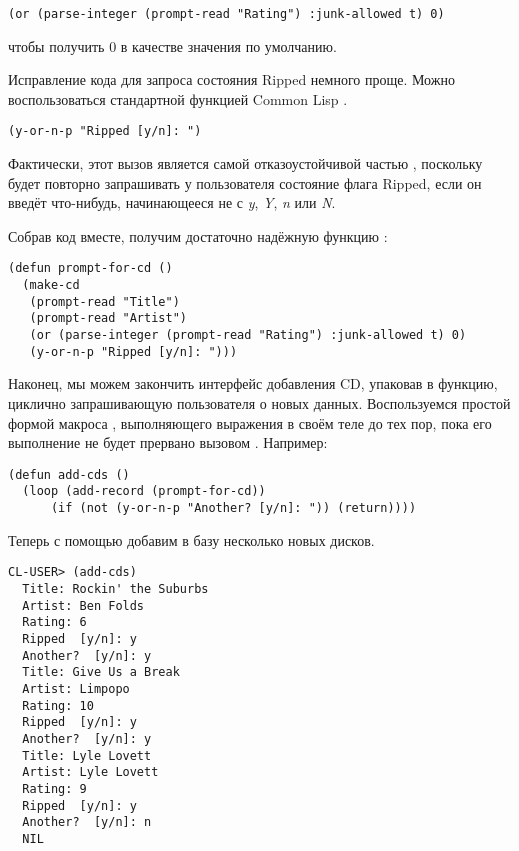 \begin{lstlisting}
(or (parse-integer (prompt-read "Rating") :junk-allowed t) 0)
\end{lstlisting}

чтобы получить 0 в качестве значения по умолчанию.

Исправление кода для запроса состояния Ripped немного проще. Можно воспользоваться
стандартной функцией Common Lisp .

\begin{lstlisting}
(y-or-n-p "Ripped [y/n]: ")
\end{lstlisting}

Фактически, этот вызов является самой отказоустойчивой частью ,
поскольку  будет повторно запрашивать у пользователя состояние флага
Ripped, если он введёт что-нибудь, начинающееся не с \textit{y}, \textit{Y}, \textit{n}
или \textit{N}.

Собрав код вместе, получим достаточно надёжную функцию :

\begin{lstlisting}
(defun prompt-for-cd ()
  (make-cd
   (prompt-read "Title")
   (prompt-read "Artist")
   (or (parse-integer (prompt-read "Rating") :junk-allowed t) 0)
   (y-or-n-p "Ripped [y/n]: ")))
\end{lstlisting}

Наконец, мы можем закончить интерфейс добавления CD, упаковав  в
функцию, циклично запрашивающую пользователя о новых данных. Воспользуемся простой формой
макроса , выполняющего выражения в своём теле до тех пор, пока его выполнение
не будет прервано вызовом . Например:

\begin{lstlisting}
(defun add-cds ()
  (loop (add-record (prompt-for-cd))
      (if (not (y-or-n-p "Another? [y/n]: ")) (return))))
\end{lstlisting}

Теперь с помощью  добавим в базу несколько новых дисков.

\begin{lstlisting}[style=lisprepl]
  CL-USER> (add-cds)
  Title: Rockin' the Suburbs
  Artist: Ben Folds
  Rating: 6
  Ripped  [y/n]: y
  Another?  [y/n]: y
  Title: Give Us a Break
  Artist: Limpopo
  Rating: 10
  Ripped  [y/n]: y
  Another?  [y/n]: y
  Title: Lyle Lovett
  Artist: Lyle Lovett
  Rating: 9
  Ripped  [y/n]: y
  Another?  [y/n]: n
  NIL
\end{lstlisting}

